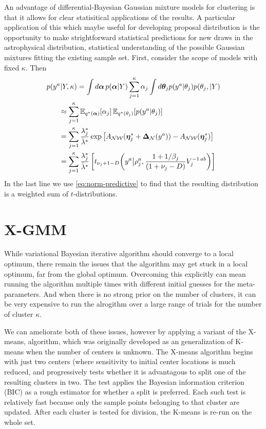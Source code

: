 \documentclass[aps,showpacs,twocolumn,prd,superscriptaddress,nofootinbib]{revtex4}
\newcommand{\nn}{\nonumber}
\newcommand{\E}[1]{{\mathbb E}_{#1}\!}
\begin{document}
An advantage of differential-Bayesian Gaussian mixture models for clustering is that it allows for clear statisitical applications of the results.  A particular application of this which maybe useful for developing proposal distribution is the opportunity to make strightforward statistical predictions for new draws in the astrophysical distribution, statistical understanding of the possible Gaussian mixtures fitting the existing sample set.  First, consider the scope of models with fixed $\kappa$. Then
\begin{align}
  p(y^a|Y,\kappa)&=\int{d\bm\alpha}\, p(\bm\alpha|Y)\sum_{j=1}^\kappa \alpha_j\int{d\bm\theta_j p(y^a|\theta_j)p(\theta_j,|Y)}\nn\\
  &\mkern-45mu\approx \sum_{j=1}^\kappa \E{q^*(\bm\alpha)}\left[\alpha_j\right]\E{q^*(\theta_j)}\left[p(y^a|\theta_j)\right]\nn\\
  &\mkern-45mu= \sum_{j=1}^\kappa \frac{\lambda^*_j}{\bar\lambda^*}\exp\left[A_{\mathcal{NW}}(\bm\eta^*_j+\bm\Delta_{\mathcal{N}}(y^a))-A_{\mathcal{NW}}(\bm\eta^*_j)\right]\nn\\
  &\mkern-45mu=\sum_{j=1}^\kappa \frac{\lambda^*_j}{\bar\lambda^*}\left[ t_{{\nu_j+1-D}}\!\left(y^a\big|\rho_j^a,\frac{1+1/\beta_j}{(1+\nu_j-D)}V_j^{-1\,ab}\right)\right]
  \label{eq:posteriorPredictive}
\end{align}
In the last line we use \eqref{eq:norm-predictive} to find that the resulting distribution is a weighted sum of $t$-distributions.

\section{X-GMM}

While variational Bayesian iterative algorithm should converge to a local optimum, there remain the issues that the algorithm may get stuck in a local optimum, far from the global optimum.  Overcoming this explicitly can mean running the algorithm multiple times with different initial guesses for the meta-parameters.  And when there is no strong prior on the number of clusters, it can be very expensive to run the alrogithm over a large range of trials for the number of cluster $\kappa$.

We can ameliorate both of these issues, however by applying a variant of the X-means, algorithm, which was originally developed as an generalization of K-means when the number of centers is unknown.  The X-means algorithm begins with just two centers (where sensitivity to initial center locations is much reduced, and progressively tests whether it is advantagous to split one of the resulting clusters in two.  The test applies the Bayesian information criterion (BIC) as a rough estimator for whether a split is preferred. Each such test is relatively fast because only the sample points belonging to that cluster are updated.  After each cluster is tested for division, the K-means is re-run on the whole set.
\end{document}
